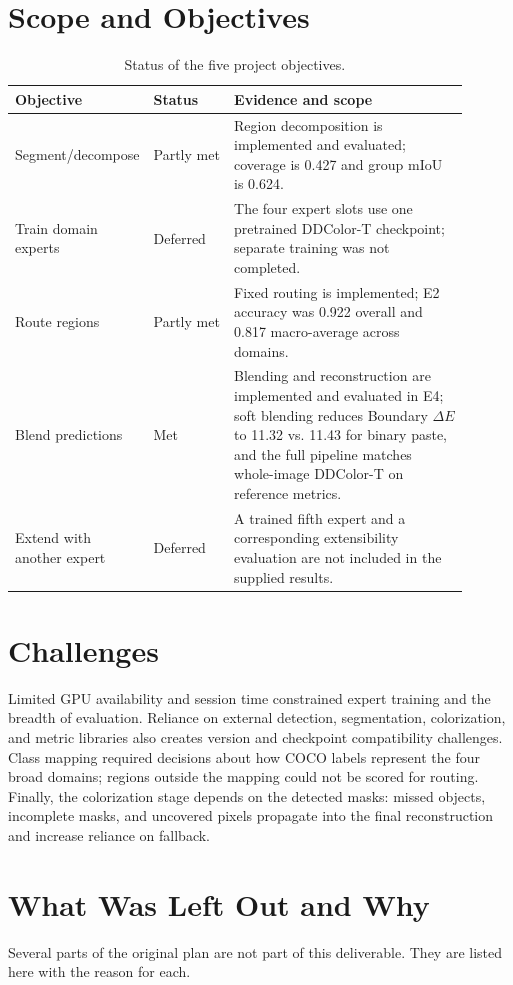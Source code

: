 \documentclass{FastFyp}
\begin{document}
\section{Scope and Objectives}
\label{sec:objectives-status}
\begin{table}[htbp]
\centering
\caption{Status of the five project objectives.}
\label{tab:objective-status}
\begin{tabular}{p{0.18\linewidth}p{0.18\linewidth}p{0.54\linewidth}}
\hline
Objective & Status & Evidence and scope\\
\hline
Segment/decompose & Partly met & Region decomposition is implemented and evaluated; coverage is 0.427 and group mIoU is 0.624.\\
Train domain experts & Deferred & The four expert slots use one pretrained DDColor-T checkpoint; separate training was not completed.\\
Route regions & Partly met & Fixed routing is implemented; E2 accuracy was 0.922 overall and 0.817 macro-average across domains.\\
Blend predictions & Met & Blending and reconstruction are implemented and evaluated in E4; soft blending reduces Boundary $\Delta E$ to 11.32 vs. 11.43 for binary paste, and the full pipeline matches whole-image DDColor-T on reference metrics.\\
Extend with another expert & Deferred & A trained fifth expert and a corresponding extensibility evaluation are not included in the supplied results.\\
\hline
\end{tabular}
\end{table}

\section{Challenges}
\label{sec:challenges}
Limited GPU availability and session time constrained expert training and
the breadth of evaluation. Reliance on external detection, segmentation,
colorization, and metric libraries also creates version and checkpoint
compatibility challenges. Class mapping required decisions about how COCO
labels represent the four broad domains; regions outside the mapping could
not be scored for routing. Finally, the colorization stage depends on the
detected masks: missed objects, incomplete masks, and uncovered pixels
propagate into the final reconstruction and increase reliance on fallback.


\section{What Was Left Out and Why}
\label{sec:omitted-work}
Several parts of the original plan are not part of this deliverable. They are listed here with the reason for each.
\end{document}

